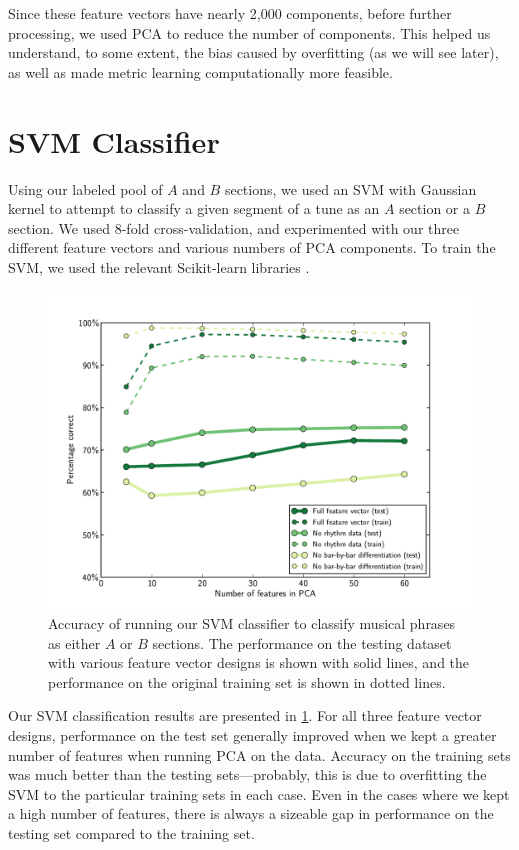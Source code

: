 \documentclass{article} %
\begin{document}
Since these feature vectors have nearly 2,000 components, before further
processing, we used PCA to reduce the number of components. This helped us
understand, to some extent, the bias caused by overfitting (as we will see
later), as well as made metric learning computationally more feasible.

\section{SVM Classifier}
Using our labeled pool of $A$ and $B$ sections, we used an SVM with Gaussian
kernel to attempt to classify a given segment of a tune as an $A$ section or a
$B$ section. We used 8-fold cross-validation, and experimented with our three
different feature vectors and various numbers of PCA components. To train the
SVM, we used the relevant Scikit-learn libraries \cite{sklearn}.


\begin{figure}
  \centering \includegraphics[width=5in]{../svm_results/svm.pdf}
  \caption{
    Accuracy of running our SVM classifier to classify musical phrases as either
    $A$ or $B$ sections. The performance on the testing dataset with various
    feature vector designs is shown with solid lines, and the performance on the
    original training set is shown in dotted lines.
  }
  \label{svmfig}
\end{figure}

Our SVM classification results are presented in \cref{svmfig}. For all three
feature vector designs, performance on the test set generally improved when we
kept a greater number of features when running PCA on the data. Accuracy on
the training sets was much better than the testing sets---probably, this is due
to overfitting the SVM to the particular training sets in each case. Even in the
cases where we kept a high number of features, there is always a sizeable gap in
performance on the testing set compared to the training set.
\end{document}
